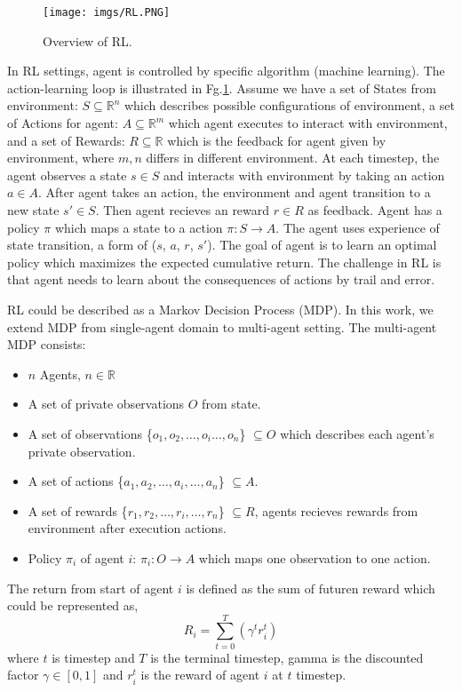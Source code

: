 \documentclass[11pt,twocolumn]{jarticle} %
\begin{document}
\begin{figure}[h]
 \begin{center}
  \texttt{[image: imgs/RL.PNG]}
  \caption{
  Overview of RL.
  }
  \label{fig:rl}
 \end{center}
\end{figure}

In RL settings, agent is controlled by specific algorithm (machine learning). The action-learning loop is illustrated in Fg.\ref{fig:rl}. Assume we have a set of States from environment: $S \subseteq \mathbb{R}^n$ which describes possible configurations of environment, a set of Actions for agent: $A \subseteq \mathbb{R}^m$ which agent executes to interact with environment, and a set of Rewards: $R \subseteq \mathbb{R}$ which is the feedback for agent given by environment, where $m, n$ differs in different environment. At each timestep, the agent observes a state $s \in S$ and interacts with environment by taking an action $a \in A$. After agent takes an action, the environment and agent transition to a new state $s' \in S$. Then agent recieves an reward $r \in R$  as feedback. Agent has a policy $\pi$ which maps  a state to a action $\pi: S \rightarrow A$. The agent uses experience of state transition, a form of ($s$, $a$, $r$, $s'$). The goal of agent is to learn an optimal policy which maximizes the expected cumulative return. The challenge in RL is that agent needs to learn about the consequences of actions by trail and error. \par

RL could be described as a Markov Decision Process (MDP). In this work, we extend MDP from single-agent domain to multi-agent setting. The multi-agent MDP consists:
\begin{itemize}
  \item $n$ Agents, $n \in \mathbb{R}$
  \item A set of private observations $O$ from state. 
  \item A set of observations \{${o_1, o_2,\ldots, o_i\ldots, o_n}$\} $\subseteq O$ which describes each agent's private observation.
  \item A set of actions \{${a_1, a_2,\ldots, a_i,\ldots, a_n}$\} $\subseteq A$.
  \item A set of rewards \{${r_1, r_2,\ldots, r_i,\ldots, r_n}$\} $\subseteq R$, agents recieves rewards from environment after execution actions.
  \item Policy $\pi_i$ of agent $i$: $\pi_i: O \rightarrow A$ which maps one observation to one action.
\end{itemize}
The return from start of agent $i$ is defined as the sum of futuren reward which could be represented as, 
$$ R_i = \sum_{t=0}^{T}(\gamma^t r^{t}_i) $$
where $t$ is timestep and $T$ is the terminal timestep, gamma is the discounted factor $\gamma \in [0, 1]$ and $r^{t}_i$ is the reward of agent $i$ at $t$ timestep.
\end{document}
